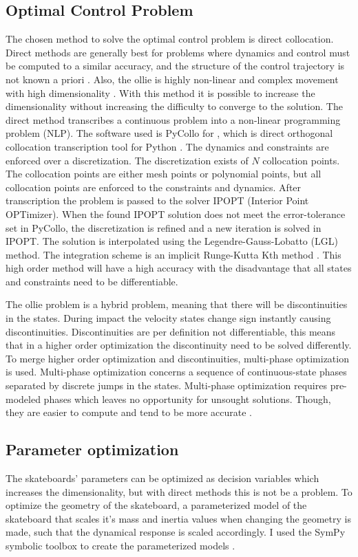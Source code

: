 \documentclass[default,iicol]{sn-jnl}
\theoremstyle{thmstyleone}%
\theoremstyle{thmstyletwo}%
\theoremstyle{thmstylethree}%
\begin{document}
\subsection{Optimal Control Problem}
The chosen method to solve the optimal control problem is direct collocation. Direct methods are generally best for problems where dynamics and control must be computed to a similar accuracy, and the structure of the control trajectory is not known a priori \cite{kelly_introduction_2017}. Also, the ollie is highly non-linear and complex movement with high dimensionality . With this method it is possible to increase the dimensionality without increasing the difficulty to converge to the solution. The direct method transcribes a continuous problem into a non-linear programming problem (NLP). The software used is PyCollo for , which is direct orthogonal collocation transcription tool for Python \cite{brockie_predictive_nodate}. The dynamics and constraints are enforced over a discretization. The discretization exists of $N$ collocation points. The collocation points are either mesh points or polynomial points, but all collocation points are enforced to the constraints and dynamics. After transcription the problem is passed to the solver IPOPT (Interior Point OPTimizer). When the found IPOPT solution does not meet the error-tolerance set in PyCollo, the discretization is refined and a new iteration is solved in IPOPT. The solution is interpolated using the Legendre-Gauss-Lobatto (LGL) method. The integration scheme is an implicit Runge-Kutta Kth method \cite{brockie_predictive_nodate}. This high order method will have a high accuracy with the disadvantage that all states and constraints need to be differentiable.

The ollie problem is a hybrid problem, meaning that there will be discontinuities in the states. During impact the velocity states change sign instantly causing discontinuities. Discontinuities are per definition not differentiable, this means that in a higher order optimization the discontinuity need to be solved differently. To merge higher order optimization and discontinuities, multi-phase optimization is used. Multi-phase optimization concerns a sequence of continuous-state phases separated by discrete jumps in the states. Multi-phase optimization requires pre-modeled phases which leaves no opportunity for unsought solutions. Though, they are easier to compute and tend to be more accurate \cite{kelly_introduction_2017}. 

\subsection{Parameter optimization}\label{s_paropt}
The skateboards' parameters can be optimized as decision variables which increases the dimensionality, but with direct methods this is not be a problem. To optimize the geometry of the skateboard, a parameterized model of the skateboard that scales it's mass and inertia values when changing the geometry is made, such that the dynamical response is scaled accordingly. I used the SymPy symbolic toolbox to create the parameterized models \cite{meurer_sympy_2017}. 
\end{document}
